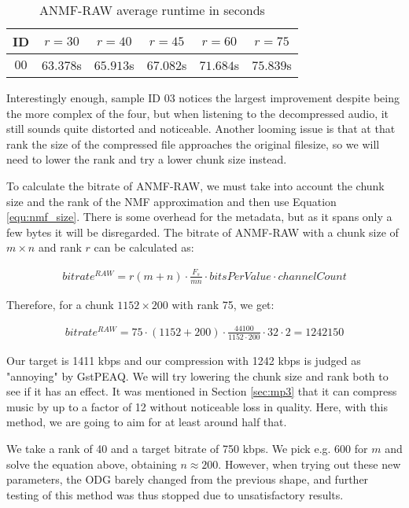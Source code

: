 \begin{table}[htbp]\caption{ANMF-RAW average runtime in seconds}
	\label{tab:anmf_raw_runtime}
	\centering
	\begin{tabular}{|c|c|c|c|c|c|}
		\hline
		ID & $r=30$ & $r=40$ & $r=45$ & $r=60$ & $r=75$ \\ \hline
		$00$ & $63.378$s & $65.913$s & $67.082$s & $71.684$s & $75.839$s \\	
		\hline
	\end{tabular}
\end{table}

Interestingly enough, sample ID 03 notices the largest improvement despite being the more complex of the four, but when listening to the decompressed audio, it still sounds quite distorted and noticeable. Another looming issue is that at that rank the size of the compressed file approaches the original filesize, so we will need to lower the rank and try a lower chunk size instead.

To calculate the bitrate of ANMF-RAW, we must take into account the chunk size and the rank of the NMF approximation and then use Equation \ref{equ:nmf_size}. There is some overhead for the metadata, but as it spans only a few bytes it will be disregarded. The bitrate of ANMF-RAW with a chunk size of $m \times n$ and rank $r$ can be calculated as:

\begin{align}
bitrate^{RAW} = r(m+n) \cdot \frac{F_s}{mn} \cdot bitsPerValue \cdot channelCount
\end{align}

Therefore, for a chunk $1152 \times 200$ with rank 75, we get:

\begin{align}
bitrate^{RAW} = 75 \cdot (1152 + 200) \cdot \frac{44100}{1152 \cdot 200} \cdot 32 \cdot 2 = 1242150
\end{align}

Our target is 1411 kbps and our compression with 1242 kbps is judged as "annoying" by GstPEAQ. We will try lowering the chunk size and rank both to see if it has an effect. It was mentioned in Section \ref{sec:mp3} that it can compress music by up to a factor of 12 without noticeable loss in quality. Here, with this method, we are going to aim for at least around half that.

We take a rank of 40 and a target bitrate of 750 kbps. We pick e.g. $600$ for $m$ and solve the equation above, obtaining $n \approx 200$. However, when trying out these new parameters, the ODG barely changed from the previous shape, and further testing of this method was thus stopped due to unsatisfactory results.

